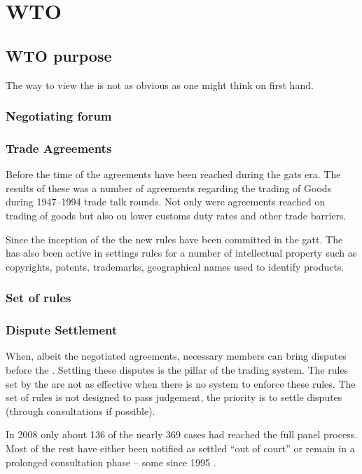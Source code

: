 \chapter{WTO}

\section{WTO purpose}
The way to view the \wto is not as obvious as one might think on first hand.

\subsection{Negotiating forum}


\subsection{Trade Agreements}
Before the time of the \wto agreements have been reached during the \gls{gats} era. The results of these was a number of agreements regarding the trading of Goods during 1947--1994 trade talk rounds. Not only were agreements reached on trading of goods but also on lower customs duty rates and other trade barriers.

Since the inception of the \wto the new rules have been committed in the \gls{gatt}. The \wto has also been active in settings rules for a number of intellectual property such as copyrights, patents, trademarks, geographical names used to identify products.

\subsection{Set of rules}




\subsection{Dispute Settlement}

When, albeit the negotiated agreements, necessary members can bring disputes before the \wto.
Settling these disputes is the pillar of the \wto trading system. The rules set by the \wto are not as effective when there is no system to enforce these rules. The set of rules is not designed to pass judgement, the priority is to settle disputes (through consultations if possible). 
 
In 2008 only about 136 of the nearly 369 cases had reached the full panel process. Most of the rest have either been notified as settled ``out of court'' or remain in a prolonged consultation phase -- some since 1995 \cite{WTO_History}.

\subsection{}